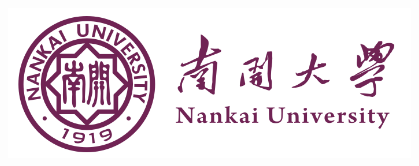 \documentclass[a4paper]{article}
\newcommand{\HRule}{\rule{\linewidth}{0.5mm}}%
\begin{document}
\renewcommand{\contentsname}{目\ 录}
\renewcommand{\appendixname}{附录}
\renewcommand{\appendixpagename}{附录}
\renewcommand{\refname}{参考文献} 
\renewcommand{\figurename}{图}
\renewcommand{\tablename}{表}
\renewcommand{\today}{\number\year 年 \number\month 月 \number\day 日}

\begin{titlepage}
    \begin{center}
    \includegraphics[width=0.8\textwidth]{NKU.png}\\[1cm]
    \vspace{20mm}
		\textbf{\huge\textbf{}}\\[0.5cm]
		\textbf{\huge{}}\\[2.3cm]
		\textbf{\Huge\textbf{}}

		\vspace{\fill}
    
    \centering
    \textsc{\LARGE {}}\\[0.5cm]
    \textsc{\LARGE {}}\\[0.5cm]
    \textsc{\LARGE {}}\\[0.5cm]
    
    \vfill
    {\Large }
    \end{center}
\end{titlepage}

\renewcommand {\thefigure}{\thesection{}.\arabic{figure}}%
\renewcommand{\figurename}{图}
\renewcommand{\contentsname}{目录}  

\clearpage
\tableofcontents
\newpage

\end{document}
